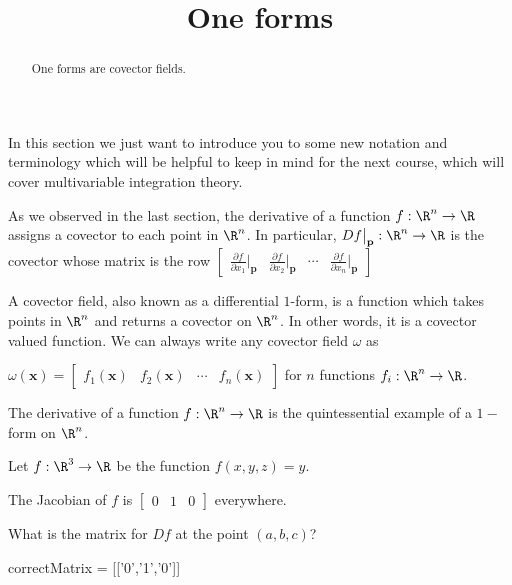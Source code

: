 \documentclass{ximera}
\title{One forms}
\begin{document}
	\begin{abstract}
		One forms are covector fields.
	\end{abstract}
	
	In this section we just want to introduce you to some new notation and terminology which will be helpful to keep in mind for the next course, which
	will cover multivariable integration theory.
	
	As we observed in the last section, the derivative of  a function $f:\R^n \to \R$ assigns a covector to each point in $\R^n$.  In particular,
	$Df\big|_{\mathbf{p}} : \R^n \to \R$ is the covector whose matrix is the row 
	\(\begin{bmatrix} \frac{\partial f}{\partial x_1}\big|_{\mathbf{p}} & \frac{\partial f}{\partial x_2}\big|_{\mathbf{p}} & \cdots & \frac{\partial f}{\partial x_n}\big|_{\mathbf{p}}\end{bmatrix}\)
	
	\begin{definition}
		A covector field, also known as a differential $1$-form, is a function which takes points in $\R^n$ and returns a covector on $\R^n$.  In other words, it is a covector
		valued function.  We can always write any covector field $\omega$ as
		
		$\omega(\mathbf{x}) = \begin{bmatrix} f_1(\mathbf{x}) &  f_2(\mathbf{x}) & \cdots &  f_n(\mathbf{x})  \end{bmatrix}$ for $n$ functions $f_i:\R^n \to \R$.
	\end{definition}
	
	The derivative of a function $f:\R^n \to \R$ is the quintessential example of a $1-$form on $\R^n$.
	
	\begin{question}
		Let $f:\R^3 \to \R$ be the function $f(x,y,z)= y$. 
		\begin{solution}
		\begin{hint}
			The Jacobian of $f$ is  $\begin{bmatrix} 0&1&0 \end{bmatrix}$ everywhere.
		\end{hint}
		 What is the matrix for $Df$ at the point $(a,b,c)$?
		 	\begin{matrix-answer}
		 		correctMatrix = [['0','1','0']]
		 	\end{matrix-answer}
		 \end{solution}
	\end{question}
	
\end{document}

